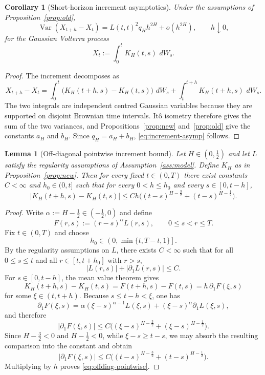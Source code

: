 \documentclass[11pt,a4paper]{amsart}
\theoremstyle{plain}
\newtheorem{lemma}[theorem]{Lemma}
\newtheorem{corollary}[theorem]{Corollary}
\theoremstyle{definition}
\theoremstyle{remark}
\DeclareMathOperator{\Var}{Var}
\newcommand{\dd}{\,d}
\begin{document}
\begin{corollary}[Short-horizon increment asymptotics]\label{cor:increment}
Under the assumptions of Proposition~\ref{prop:old},
\begin{equation}\label{eq:increment-asymp}
\Var(X_{t+h}-X_t)
=
L(t,t)^2 q_H h^{2H}+o(h^{2H}),
\qquad h\downarrow0,
\end{equation}
for the Gaussian Volterra process
\[
X_t:=\int_0^t K_H(t,s)\,\dd W_s.
\]
\end{corollary}

\begin{proof}
The increment decomposes as
\[
X_{t+h}-X_t
=
\int_0^t\bigl(K_H(t+h,s)-K_H(t,s)\bigr)\,\dd W_s
+
\int_t^{t+h}K_H(t+h,s)\,\dd W_s.
\]
The two integrals are independent centred Gaussian variables because they are supported on disjoint
Brownian time intervals.  It\^o isometry therefore gives the sum of the two variances, and
Propositions~\ref{prop:new} and~\ref{prop:old} give the constants \(a_H\) and \(b_H\).  Since
\(q_H=a_H+b_H\), \eqref{eq:increment-asymp} follows.
\end{proof}

\begin{lemma}[Off-diagonal pointwise increment bound]\label{lem:offdiag-pointwise}
Let $H\in(0,\tfrac12)$ and let $L$ satisfy the regularity assumptions of
Assumption~\ref{ass:model}. Define $K_H$ as in Proposition~\ref{prop:new}. Then for every fixed
$t\in(0,T)$ there exist constants $C<\infty$ and $h_0\in(0,t]$ such that for every
$0<h\le h_0$ and every $s\in[0,t-h]$,
\begin{equation}\label{eq:offdiag-pointwise}
|K_H(t+h,s)-K_H(t,s)|
\le
Ch\bigl((t-s)^{H-\frac32}+(t-s)^{H-\frac12}\bigr).
\end{equation}
\end{lemma}

\begin{proof}
Write $\alpha:=H-\tfrac12\in(-\tfrac12,0)$ and define
\[
F(r,s):=(r-s)^\alpha L(r,s),
\qquad 0\le s<r\le T.
\]
Fix $t\in(0,T)$ and choose
\[
h_0\in\left(0,\min\{t,T-t,1\}\right].
\]
By the regularity assumptions on $L$, there exists $C<\infty$ such that for all
$0\le s\le t$ and all $r\in[t,t+h_0]$ with $r>s$,
\[
|L(r,s)|+|\partial_1L(r,s)|\le C.
\]
For $s\in[0,t-h]$, the mean value theorem gives
\[
K_H(t+h,s)-K_H(t,s)
=
F(t+h,s)-F(t,s)
=
h\,\partial_1F(\xi,s)
\]
for some $\xi\in(t,t+h)$. Because $s\le t-h<\xi$, one has
\[
\partial_1F(\xi,s)
=
\alpha(\xi-s)^{\alpha-1}L(\xi,s)
+
(\xi-s)^\alpha \partial_1L(\xi,s),
\]
and therefore
\[
|\partial_1F(\xi,s)|
\le
C\bigl((\xi-s)^{H-\frac32}+(\xi-s)^{H-\frac12}\bigr).
\]
Since $H-\tfrac32<0$ and $H-\tfrac12<0$, while $\xi-s\ge t-s$, we may absorb the resulting
comparison into the constant and obtain
\[
|\partial_1F(\xi,s)|
\le
C\bigl((t-s)^{H-\frac32}+(t-s)^{H-\frac12}\bigr).
\]
Multiplying by $h$ proves \eqref{eq:offdiag-pointwise}.
\end{proof}
\end{document}
